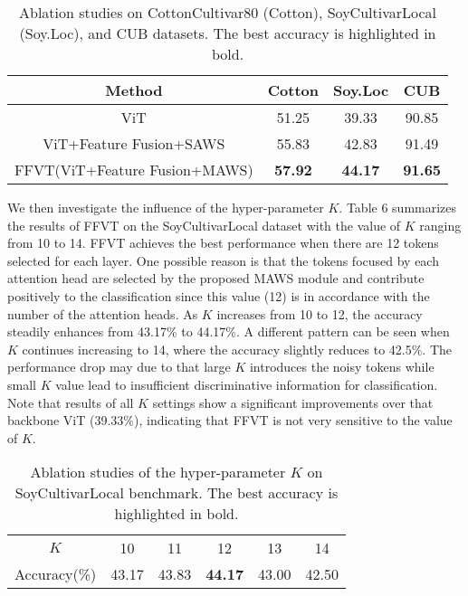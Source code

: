 \documentclass{bmvc2k}
\begin{document}
\begin{table}[!h]
\caption{Ablation studies on CottonCultivar80 (Cotton), SoyCultivarLocal (Soy.Loc), and CUB datasets. The best accuracy is highlighted in bold.}
\centering
\begin{tabular}{c|c|c|c}
\toprule  
Method& Cotton& Soy.Loc& CUB \\
\hline
ViT \cite{dosovitskiy2020image}&51.25&  39.33&  90.85\\
\hline
ViT+Feature Fusion+SAWS &55.83& 42.83&  91.49 \\
\hline
FFVT(ViT+Feature Fusion+MAWS)&\textbf{57.92} & \textbf{44.17} & \textbf{91.65} \\
\bottomrule 
\end{tabular}
\end{table}

We then investigate the influence of the hyper-parameter $K$. Table 6 summarizes the results of FFVT on the SoyCultivarLocal dataset with the value of $K$ ranging from 10 to 14. FFVT achieves the best performance when there are 12 tokens selected for each layer. One possible reason is that the tokens focused by each attention head are selected by the proposed MAWS module and contribute positively to the classification since this value (12) is in accordance with the number of the attention heads. As $K$ increases from 10 to 12, the accuracy steadily enhances from 43.17\% to 44.17\%. A different pattern can be seen when $K$ continues increasing to 14, where the accuracy slightly reduces to 42.5\%. The performance drop may due to that large $K$ introduces the noisy tokens while small $K$ value lead to insufficient discriminative information for classification. Note that results of all $K$ settings show a significant improvements over that backbone ViT (39.33\%), indicating that FFVT is not very sensitive to the value of $K$.

\begin{table}[!h]
\caption{Ablation studies of the hyper-parameter $K$ on SoyCultivarLocal benchmark. The best accuracy is highlighted in bold.}
\centering
\begin{tabular}{cccccc}
\toprule  
$K$ & 10& 11& 12& 13& 14 \\
Accuracy(\%) &43.17&  43.83& \textbf{44.17}& 43.00& 42.50\\

\bottomrule 
\end{tabular}
\end{table}
\end{document}
